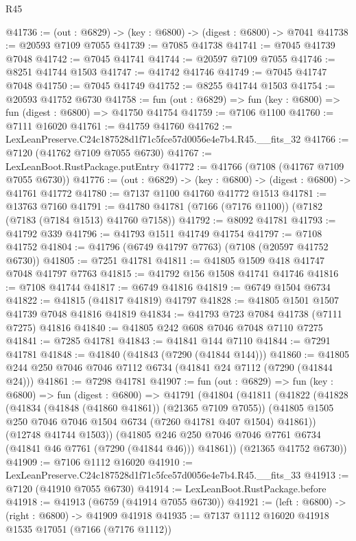 \begin{lexlean}{R45}
\begin{coremodule}
{@41736 := (out : @6829) -> (key : @6800) -> (digest : @6800) -> @7041
@41738 := @20593 @7109 @7055
@41739 := @7085 @41738
@41741 := @7045 @41739 @7048
@41742 := @7045 @41741
@41744 := @20597 @7109 @7055
@41746 := @8251 @41744 @1503
@41747 := @41742 @41746
@41749 := @7045 @41747 @7048
@41750 := @7045 @41749
@41752 := @8255 @41744 @1503
@41754 := @20593 @41752 @6730
@41758 := fun (out : @6829) => fun (key : @6800) => fun (digest : @6800) => @41750 @41754
@41759 := @7106 @1100
@41760 := @7111 @16020
@41761 := @41759 @41760
@41762 := LexLeanPreserve.C24c187528d1f71c5fce57d0056e4e7b4.R45.__fits_32
@41766 := @7120 (@41762 @7109 @7055 @6730)
@41767 := LexLeanBoot.RustPackage.putEntry
@41772 := @41766 (@7108 (@41767 @7109 @7055 @6730))
@41776 := (out : @6829) -> (key : @6800) -> (digest : @6800) -> @41761 @41772
@41780 := @7137 @1100 @41760 @41772 @1513
@41781 := @13763 @7160
@41791 := @41780 @41781 (@7166 (@7176 @1100)) (@7182 (@7183 (@7184 @1513) @41760 @7158))
@41792 := @8092 @41781
@41793 := @41792 @339
@41796 := @41793 @1511 @41749 @41754
@41797 := @7108 @41752
@41804 := @41796 (@6749 @41797 @7763) (@7108 (@20597 @41752 @6730))
@41805 := @7251 @41781
@41811 := @41805 @1509 @418 @41747 @7048 @41797 @7763
@41815 := @41792 @156 @1508 @41741 @41746
@41816 := @7108 @41744
@41817 := @6749 @41816
@41819 := @6749 @1504 @6734
@41822 := @41815 (@41817 @41819) @41797
@41828 := @41805 @1501 @1507 @41739 @7048 @41816 @41819
@41834 := @41793 @723 @7084 @41738 (@7111 @7275) @41816
@41840 := @41805 @242 @608 @7046 @7048 @7110 @7275
@41841 := @7285 @41781
@41843 := @41841 @144 @7110
@41844 := @7291 @41781
@41848 := @41840 (@41843 (@7290 (@41844 @144)))
@41860 := @41805 @244 @250 @7046 @7046 @7112 @6734 (@41841 @24 @7112 (@7290 (@41844 @24)))
@41861 := @7298 @41781
@41907 := fun (out : @6829) =>
  fun (key : @6800) =>
  fun (digest : @6800) =>
  @41791
    (@41804
      (@41811
        (@41822
          (@41828
            (@41834 (@41848 (@41860 @41861)) (@21365 @7109 @7055))
            (@41805 @1505 @250 @7046 @7046 @1504 @6734 (@7260 @41781 @407 @1504) @41861))
          (@12748 @41744 @1503))
        (@41805 @246 @250 @7046 @7046 @7761 @6734 (@41841 @46 @7761 (@7290 (@41844 @46))) @41861))
      (@21365 @41752 @6730))
@41909 := @7106 @1112 @16020
@41910 := LexLeanPreserve.C24c187528d1f71c5fce57d0056e4e7b4.R45.__fits_33
@41913 := @7120 (@41910 @7055 @6730)
@41914 := LexLeanBoot.RustPackage.before
@41918 := @41913 (@6759 (@41914 @7055 @6730))
@41921 := (left : @6800) -> (right : @6800) -> @41909 @41918
@41935 := @7137
    @1112
    @16020
    @41918
    @1535
    @17051
    (@7166 (@7176 @1112))
}
\end{coremodule}
\end{lexlean}
